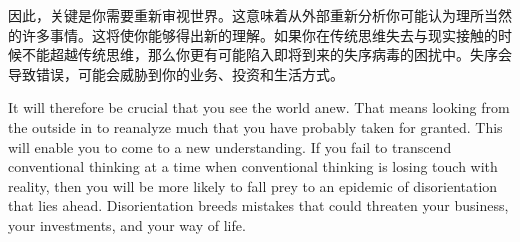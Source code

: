 \begin{paracol}{2}
\switchcolumn*
因此，关键是你需要重新审视世界。这意味着从外部重新分析你可能认为理所当然的许多事情。这将使你能够得出新的理解。如果你在传统思维失去与现实接触的时候不能超越传统思维，那么你更有可能陷入即将到来的失序病毒的困扰中。失序会导致错误，可能会威胁到你的业务、投资和生活方式。

\switchcolumn
It will therefore be crucial that you see the world anew. That means looking from the outside in to reanalyze much that you have probably taken for granted. This will enable you to come to a new understanding. If you fail to transcend conventional thinking at a time when conventional thinking is losing touch with reality, then you will be more likely to fall prey to an epidemic of disorientation that lies ahead. Disorientation breeds mistakes that could threaten your business, your investments, and your way of life. 
\end{paracol}

